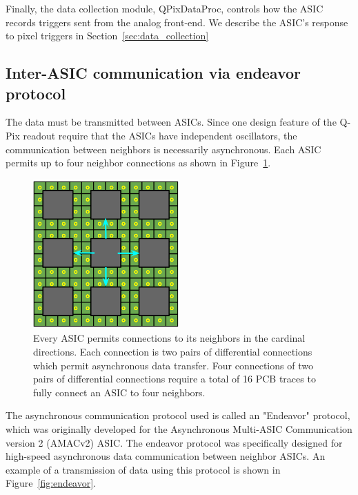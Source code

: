 Finally, the data collection module, QPixDataProc, controls how the ASIC records triggers sent from the analog front-end.
We describe the ASIC's response to pixel triggers in Section~\ref{sec:data_collection}


\subsection{Inter-ASIC communication via endeavor protocol}\label{sec:endeavor}
The data must be transmitted between ASICs.
Since one design feature of the Q-Pix readout require that the ASICs have independent oscillators, the communication between neighbors is necessarily asynchronous.
Each ASIC permits up to four neighbor connections as shown in Figure~\ref{fig:example_connections}.

\begin{figure}[]
\centering
\includegraphics[width=0.5\textwidth]{images/asic_neighbor_connections_qpix.png}
\caption{Every ASIC permits connections to its neighbors in the cardinal directions.
Each connection is two pairs of differential connections which permit asynchronous data transfer.
Four connections of two pairs of differential connections require a total of 16 PCB traces to fully connect an ASIC to four neighbors.
}
\label{fig:example_connections}
\end{figure}

The asynchronous communication protocol used is called an "Endeavor" protocol, which was originally developed for the Asynchronous Multi-ASIC Communication version 2 (AMACv2) ASIC.
The endeavor protocol was specifically designed for high-speed asynchronous data communication between neighbor ASICs.
An example of a transmission of data using this protocol is shown in Figure~\ref{fig:endeavor}.

